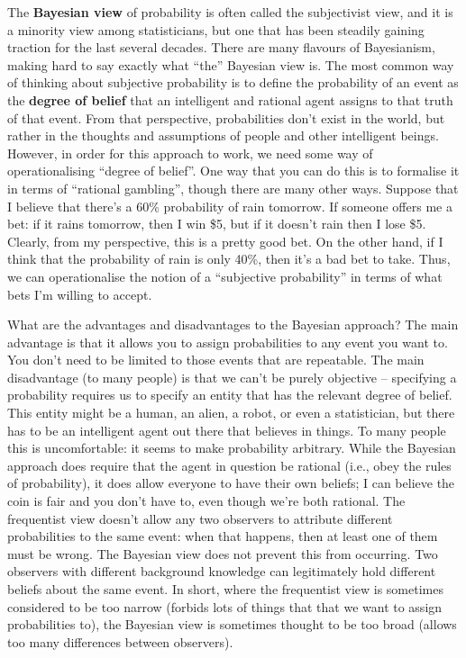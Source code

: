 \documentclass[
]{book}
\begin{document}
The \textbf{Bayesian view} of probability is often called the subjectivist view, and it is a minority view among statisticians, but one that has been steadily gaining traction for the last several decades. There are many flavours of Bayesianism, making hard to say exactly what ``the'' Bayesian view is. The most common way of thinking about subjective probability is to define the probability of an event as the \textbf{degree of belief} that an intelligent and rational agent assigns to that truth of that event. From that perspective, probabilities don't exist in the world, but rather in the thoughts and assumptions of people and other intelligent beings. However, in order for this approach to work, we need some way of operationalising ``degree of belief''. One way that you can do this is to formalise it in terms of ``rational gambling'', though there are many other ways. Suppose that I believe that there's a 60\% probability of rain tomorrow. If someone offers me a bet: if it rains tomorrow, then I win \$5, but if it doesn't rain then I lose \$5. Clearly, from my perspective, this is a pretty good bet. On the other hand, if I think that the probability of rain is only 40\%, then it's a bad bet to take. Thus, we can operationalise the notion of a ``subjective probability'' in terms of what bets I'm willing to accept.

What are the advantages and disadvantages to the Bayesian approach? The main advantage is that it allows you to assign probabilities to any event you want to. You don't need to be limited to those events that are repeatable. The main disadvantage (to many people) is that we can't be purely objective -- specifying a probability requires us to specify an entity that has the relevant degree of belief. This entity might be a human, an alien, a robot, or even a statistician, but there has to be an intelligent agent out there that believes in things. To many people this is uncomfortable: it seems to make probability arbitrary. While the Bayesian approach does require that the agent in question be rational (i.e., obey the rules of probability), it does allow everyone to have their own beliefs; I can believe the coin is fair and you don't have to, even though we're both rational. The frequentist view doesn't allow any two observers to attribute different probabilities to the same event: when that happens, then at least one of them must be wrong. The Bayesian view does not prevent this from occurring. Two observers with different background knowledge can legitimately hold different beliefs about the same event. In short, where the frequentist view is sometimes considered to be too narrow (forbids lots of things that that we want to assign probabilities to), the Bayesian view is sometimes thought to be too broad (allows too many differences between observers).
\end{document}
